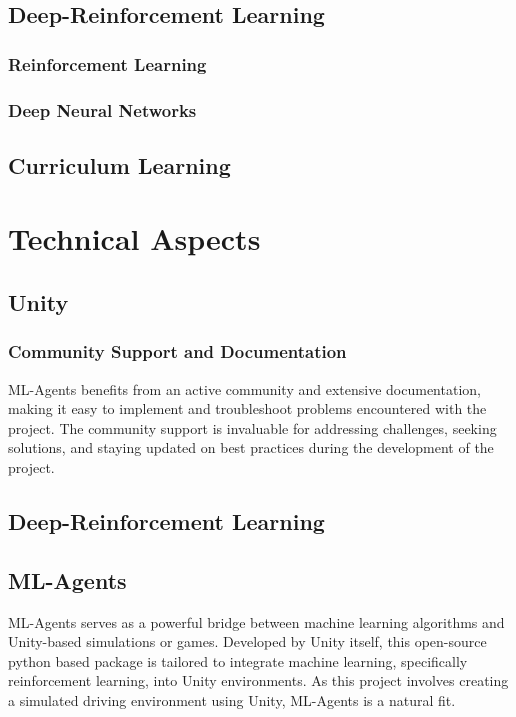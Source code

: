 \documentclass{article}
\begin{document}
\subsection{Deep-Reinforcement Learning}
\lipsum[2][1]

\subsubsection{Reinforcement Learning}
\lipsum[2][1]

\subsubsection{Deep Neural Networks}
\lipsum[2][1]

\subsection{Curriculum Learning}
\lipsum[2][1]

\section{Technical Aspects}
\lipsum[2][1]

\subsection{Unity}

\subsubsection{Community Support and Documentation}
ML-Agents benefits from an active community and extensive documentation, making it easy to implement and troubleshoot problems encountered with the project. The community support is invaluable for addressing challenges, seeking solutions, and staying updated on best practices during the development of the project.

\subsection{Deep-Reinforcement Learning}
\lipsum[2][1]

\subsection{ML-Agents}
ML-Agents serves as a powerful bridge between machine learning algorithms and Unity-based simulations or games. Developed by Unity itself, this open-source python based package is tailored to integrate machine learning, specifically reinforcement learning, into Unity environments. As this project involves creating a simulated driving environment using Unity, ML-Agents is a natural fit.\\
\end{document}
